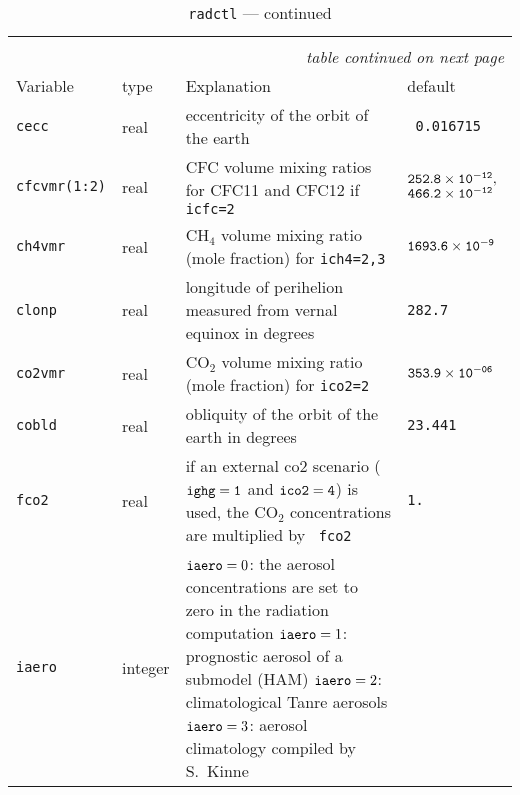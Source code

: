 \setlength{\LTcapwidth}{\textwidth}
\setlength{\LTleft}{0pt}\setlength{\LTright}{0pt}

\begin{longtable}{l@{\extracolsep\fill}lp{7cm}p{3.5cm}}\hline\hline
\caption[Namelist {\tt radctl}]{Namelist
  {\tt radctl}}\\\hline\label{tabradctl}
\endfirsthead
\caption[]{{\tt radctl} --- continued}\\\hline
\endhead
\hline\multicolumn{4}{r}{\slshape table continued on next page}\\
\endfoot
\hline %
\endlastfoot

Variable & type & Explanation & default \\\hline
{\tt cecc}\index{namelist variables!cecc}
 &real & eccentricity of the orbit of the earth& {\tt
  0.016715}\\ 
{\tt cfcvmr(1:2)}\index{namelist variables!cfcvmr}
 & real &  CFC volume mixing ratios for CFC11 and
  CFC12 if {\tt icfc=2} & ${\tt 252.8\times10^{-12},}$ ${\tt
    466.2\times10^{-12}}$\\ 
{\tt   ch4vmr}\index{namelist variables!ch4vmr}
 & real & CH$_4$ volume mixing ratio (mole fraction)
  for {\tt ich4=2,3} & ${\tt 1693.6\times10^{-9}}$ \\
{\tt clonp}\index{namelist variables!clonp}
 &real &longitude of perihelion measured from vernal
  equinox in degrees&{\tt 282.7}\\
{\tt   co2vmr}\index{namelist variables!co2vmr}
 & real & CO$_2$ volume mixing ratio (mole fraction)
  for {\tt ico2=2} & ${\tt 353.9\times10^{-06}}$ \\
{\tt cobld}\index{namelist variables!cobld}
 &real & obliquity of the orbit of the earth in
  degrees&{\tt 23.441}\\ 
{\tt fco2}\index{namelist variables!fco2}
  &real & if an external co2 scenario ($\tt ighg=1$ and
$\tt ico2=4$) is used, the CO$_2$ concentrations are multiplied by {\tt
  fco2} & {\tt 1.}\\ 
{\tt iaero}\index{namelist variables!iaero}
 & integer & ${\tt iaero}= 0$: the aerosol concentrations
  are set to 
  zero  in the radiation computation \newline
  ${\tt  iaero} = 1$: prognostic aerosol of a submodel (HAM)\newline
  ${\tt  iaero} = 2$: climatological Tanre aerosols\newline
  ${\tt  iaero} = 3$: aerosol climatology compiled by S.~Kinne \newline 

\end{longtable}
